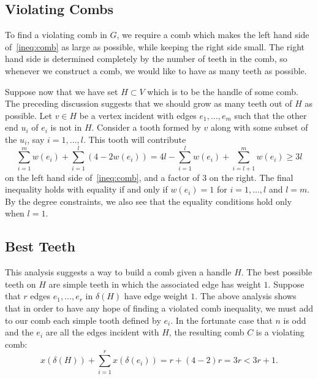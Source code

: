 \documentclass[11pt, letterpaper]{amsart}
\theoremstyle{plain}
\theoremstyle{definition}
\theoremstyle{remark}
\begin{document}
\subsection{Violating Combs}
To find a violating comb in $G$, we require a comb which makes the left hand
side of~\eqref{ineq:comb} as large as possible, while keeping the right side small. The
right hand side is determined completely by the number of teeth in the comb, so
whenever we construct a comb, we would like to have as many teeth as possible.

Suppose now that we have set $H \subset V$ which is to be the handle of some
comb.  The preceding discussion suggests that we should grow as many teeth out
of $H$ as possible. Let $v \in H$ be a vertex incident with edges
$e_1,\ldots,e_m$ such that the other end $u_i$ of $e_i$ is not in $H$. Consider
a tooth formed by $v$ along with some subset of the $u_i$, say $i =
1,\ldots,l$. This tooth will contribute
\begin{equation*}
  \sum^m_{i = 1}w(e_i) + \sum^l_{i = 1} (4 - 2w(e_i)) = 4l - \sum^l_{i = 1} w(e_i) + \sum^m_{i = l + 1}w(e_i) \geq 3l
\end{equation*}
on the left hand side of~\eqref{ineq:comb}, and a factor of $3$ on the right. The final
inequality holds with equality if and only if $w(e_i) = 1$ for $i = 1,\ldots,l$
and $l = m$. By the degree constraints, we also see that the equality conditions
hold only when $l = 1$.

\subsection{Best Teeth}
This analysis suggests a way to build a comb given a handle $H$. The best
possible teeth on $H$ are simple teeth in which the associated edge has weight
$1$. Suppose that $r$ edges $e_1,\ldots,e_r$ in $\delta(H)$ have edge weight
$1$.  The above analysis shows that in order to have any hope of finding a
violated comb inequality, we must add to our comb each simple tooth defined by
$e_i$. In the fortunate case that $n$ is odd and the $e_i$ are all the edges
incident with $H$, the resulting comb $C$ is a violating comb:
\begin{equation*}
  x(\delta(H)) + \sum^r_{i = 1}x(\delta(e_i)) = r + (4 - 2)r = 3r < 3r + 1.
\end{equation*}
\end{document}
